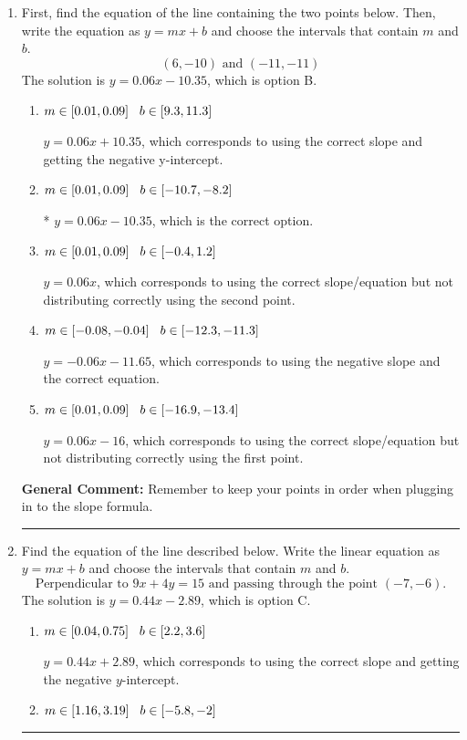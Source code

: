 \documentclass{extbook}[14pt]
\newcommand{\litem}[1]{\item #1

\rule{\textwidth}{0.4pt}}
\begin{document}
\begin{enumerate}\litem{
First, find the equation of the line containing the two points below. Then, write the equation as $ y=mx+b $ and choose the intervals that contain $m$ and $b$.
\[ (6, -10) \text{ and } (-11, -11) \]
The solution is \( y = 0.06x -10.35 \), which is option B.\begin{enumerate}[label=\Alph*.]
\item \( m \in [0.01, 0.09] \hspace*{3mm} b \in [9.3, 11.3] \)

 $y = 0.06x + 10.35$, which corresponds to using the correct slope and getting the negative y-intercept.
\item \( m \in [0.01, 0.09] \hspace*{3mm} b \in [-10.7, -8.2] \)

* $y = 0.06x -10.35$, which is the correct option.
\item \( m \in [0.01, 0.09] \hspace*{3mm} b \in [-0.4, 1.2] \)

 $y = 0.06x$, which corresponds to using the correct slope/equation but not distributing correctly using the second point.
\item \( m \in [-0.08, -0.04] \hspace*{3mm} b \in [-12.3, -11.3] \)

 $y = -0.06x -11.65$, which corresponds to using the negative slope and the correct equation.
\item \( m \in [0.01, 0.09] \hspace*{3mm} b \in [-16.9, -13.4] \)

 $y = 0.06x -16$, which corresponds to using the correct slope/equation but not distributing correctly using the first point.
\end{enumerate}

\textbf{General Comment:} Remember to keep your points in order when plugging in to the slope formula.
}
\litem{
Find the equation of the line described below. Write the linear equation as $ y=mx+b $ and choose the intervals that contain $m$ and $b$.
\[ \text{Perpendicular to } 9 x + 4 y = 15 \text{ and passing through the point } (-7, -6). \]
The solution is \( y = 0.44x - 2.89 \), which is option C.\begin{enumerate}[label=\Alph*.]
\item \( m \in [0.04, 0.75] \hspace*{3mm} b \in [2.2, 3.6] \)

 $y = 0.44x + 2.89$, which corresponds to using the correct slope and getting the negative $y$-intercept.
\item \( m \in [1.16, 3.19] \hspace*{3mm} b \in [-5.8, -2] \)


\end{enumerate}}
\end{enumerate}
\end{document}
